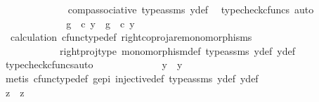 \begin{isabellebody}
\ \ \ \ \ \ \ \ \ \ \ \ \isamarkupfalse%
\ comp{\isacharunderscore}{\kern0pt}associative{}\ type{\isacharunderscore}{\kern0pt}assms{\isacharparenleft}{\kern0pt}{}{\isacharparenright}{\kern0pt}\ y{}{\isacharunderscore}{\kern0pt}def\ \isamarkupfalse%
\ {\isacharparenleft}{\kern0pt}typecheck{\isacharunderscore}{\kern0pt}cfuncs{\isacharcomma}{\kern0pt}\ auto{\isacharparenright}{\kern0pt}\isanewline
\ \ \ \ \ \ \ \ \ \ \isamarkupfalse%
\ \isamarkupfalse%
\ {\isachardoublequoteopen}g\ \ {\isasymcirc}\isactrlsub c\ y{}\ {\isacharequal}{\kern0pt}\ g\ \ {\isasymcirc}\isactrlsub c\ y{}{\isachardoublequoteclose}\isanewline
\ \ \ \ \ \ \ \ \ \ \ \ \isamarkupfalse%
\ \ calculation\ cfunc{\isacharunderscore}{\kern0pt}type{\isacharunderscore}{\kern0pt}def\ right{\isacharunderscore}{\kern0pt}coproj{\isacharunderscore}{\kern0pt}are{\isacharunderscore}{\kern0pt}monomorphisms\isanewline
\ \ \ \ \ \ \ \ \ \ \ \ right{\isacharunderscore}{\kern0pt}proj{\isacharunderscore}{\kern0pt}type\ monomorphism{\isacharunderscore}{\kern0pt}def\ type{\isacharunderscore}{\kern0pt}assms{\isacharparenleft}{\kern0pt}{}{\isacharparenright}{\kern0pt}\ y{}{\isacharunderscore}{\kern0pt}def\ y{}{\isacharunderscore}{\kern0pt}def\ \isamarkupfalse%
\ {\isacharparenleft}{\kern0pt}typecheck{\isacharunderscore}{\kern0pt}cfuncs{\isacharcomma}{\kern0pt}auto{\isacharparenright}{\kern0pt}\isanewline
\ \ \ \ \ \ \ \ \ \ \isamarkupfalse%
\ \isamarkupfalse%
\ {\isachardoublequoteopen}y{}\ {\isacharequal}{\kern0pt}\ y{}{\isachardoublequoteclose}\isanewline
\ \ \ \ \ \ \ \ \ \ \ \ \isamarkupfalse%
\ {\isacharparenleft}{\kern0pt}metis\ cfunc{\isacharunderscore}{\kern0pt}type{\isacharunderscore}{\kern0pt}def\ g{\isacharunderscore}{\kern0pt}epi\ injective{\isacharunderscore}{\kern0pt}def\ type{\isacharunderscore}{\kern0pt}assms{\isacharparenleft}{\kern0pt}{}{\isacharparenright}{\kern0pt}\ y{}{\isacharunderscore}{\kern0pt}def\ y{}{\isacharunderscore}{\kern0pt}def{\isacharparenright}{\kern0pt}\isanewline
\ \ \ \ \ \ \ \ \isamarkupfalse%
\isanewline
\ \ \ \ \ \ \ \ \isamarkupfalse%
\ \isamarkupfalse%
\ {\isachardoublequoteopen}z{}\ {\isacharequal}{\kern0pt}\ z{}{\isachardoublequoteclose}\isanewline
\ \ \ \ \ \ \ \ \ \ \isamarkupfalse%

\end{isabellebody}
